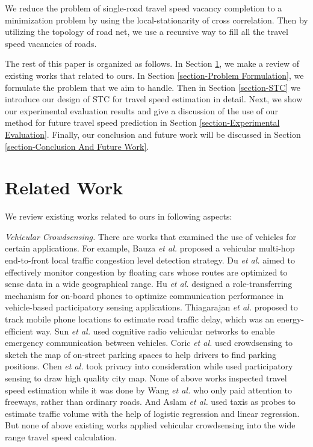 \documentclass[twocolumn,10pt,final,conference]{IEEEtran}
\def\etal{\textit{et al.}\xspace}
\begin{document}
We reduce the problem of single-road travel speed vacancy completion to a minimization problem by using the local-stationarity of cross correlation. Then by utilizing the topology of road net, we use a recursive way to fill all the travel speed vacancies of roads.

The rest of this paper is organized as follows. In Section \ref{section-Related Works}, we make a review of existing works that related to ours. In Section \ref{section-Problem Formulation}, we formulate the problem that we aim to handle.
Then in Section \ref{section-STC} we introduce our design of STC for travel speed estimation in detail.
Next, we show our experimental evaluation results and give a discussion of the use of our method for future travel speed prediction in Section \ref{section-Experimental Evaluation}. Finally, our conclusion and future work will be discussed in Section \ref{section-Conclusion And Future Work}.
\section{Related Work}\label{section-Related Works}
We review  existing works related to ours in following aspects:

\emph{Vehicular Crowdsensing.}
There are works that examined the use of vehicles for certain applications. For example, Bauza \etal \cite{Ref13} proposed a vehicular multi-hop end-to-front local traffic congestion level detection strategy. Du \etal \cite{Ref16} aimed to effectively monitor congestion by floating cars whose routes are optimized to sense data in a wide geographical range. Hu \etal \cite{Ref101} designed a role-transferring mechanism for on-board phones to optimize communication performance in vehicle-based participatory sensing applications. Thiagarajan \etal \cite{VTrack} proposed to track mobile phone locations to estimate road traffic delay, which was an energy-efficient way. Sun \etal \cite{EnablingEmergency} used cognitive radio vehicular networks to enable emergency communication between vehicles. Coric \etal \cite{Ref42} used crowdsensing to sketch the map of on-street parking spaces to help drivers to find parking positions. Chen \etal \cite{Ref76} took privacy into consideration while used participatory sensing to draw high quality city map. None of above works inspected travel speed estimation while it was done by Wang \etal \cite{Ref80} who only paid attention to freeways, rather than ordinary roads. And Aslam \etal \cite{Ref79} used taxis as probes to estimate traffic volume with the help of logistic regression and linear regression. But none of above existing works applied vehicular crowdsensing into the wide range travel speed calculation.
\end{document}
